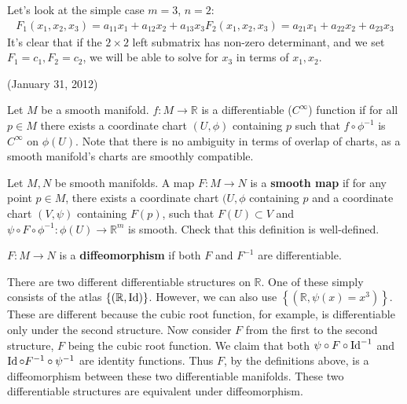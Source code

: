 \documentclass{mathnotes}
\begin{document}
\begin{exmp}
Let's look at the simple case $m=3$, $n=2$:
\begin{align*}
F_1(x_1,x_2,x_3)=a_{11}x_1+a_{12}x_2+a_{13}x_3
F_2(x_1,x_2,x_3)=a_{21}x_1+a_{22}x_2+a_{23}x_3
\end{align*}
It's clear that if the $2\times2$ left submatrix has non-zero determinant, and we set $F_1=c_1,F_2=c_2$, we will be able to solve for $x_3$ in terms of $x_1,x_2$.
\end{exmp}

(January 31, 2012)
\begin{defn}
    Let $M$ be a smooth manifold. $f:M\to\mathbb{R}$ is a differentiable ($C^\infty$) function if for all $p\in M$ there exists a coordinate chart 
    $(U,\phi)$ containing $p$ such that $f\circ \phi^{-1}$ is $C^\infty$ on $\phi(U)$. Note that there is no ambiguity in terms of overlap of charts,
    as a smooth manifold's charts are smoothly compatible.
\end{defn}

\begin{defn}
    Let $M, N$ be smooth manifolds. A map $F:M\to N$ is a \textbf{smooth map} if for any point $p\in M$, there exists a coordinate chart $(U,\phi$ containing
    $p$ and a coordinate chart $(V,\psi)$ containing $F(p)$, such that $F(U)\subset V$ and $\psi\circ F\circ \phi^{-1}:\phi(U)\to\mathbb{R}^m$ is smooth.
    Check that this definition is well-defined.
\end{defn}

\begin{defn}
    $F:M\to N$ is a \textbf{diffeomorphism} if both $F$ and $F^{-1}$ are differentiable.
\end{defn}

\begin{exmp}
    There are two different differentiable structures on $\mathbb{R}$. One of these simply consists of the atlas $\left\{ (\mathbb{R},\operatorname{Id}) \right\}$. However,
    we can also use $\left\{ (\mathbb{R},\psi(x)=x^3) \right\}$. These are different because the cubic root function, for example, is differentiable only under
    the second structure. Now consider $F$ from the first to the second structure, $F$ being the cubic root function. We claim that both $\psi\circ F\circ \operatorname{Id}^{-1}$
    and $\operatorname{Id}\circ F^{-1}\circ \psi^{-1}$ are identity functions. Thus $F$, by the definitions above, is a diffeomorphism between these two differentiable manifolds.
    These two differentiable structures are equivalent under diffeomorphism.
\end{exmp}
\end{document}
